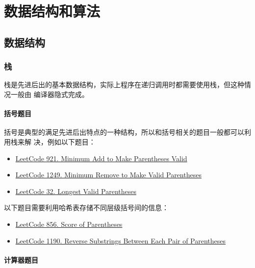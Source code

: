 \part{数据结构和算法}

\chapter{数据结构}

\section{栈}
栈是先进后出的基本数据结构，实际上程序在递归调用时都需要使用栈，但这种情况一般由
编译器隐式完成。

\subsection{括号题目}
括号是典型的满足先进后出特点的一种结构，所以和括号相关的题目一般都可以利用栈来解
决，例如以下题目：


\begin{itemize}
  \item
    \href{https://leetcode.com/problems/minimum-add-to-make-parentheses-valid/}{LeetCode
      921. Minimum Add to Make Parentheses Valid}
  \item
    \href{https://leetcode.com/problems/minimum-remove-to-make-valid-parentheses/}{LeetCode
      1249. Minimum Remove to Make Valid Parentheses}
  \item
    \href{https://leetcode.com/problems/longest-valid-parentheses/}{LeetCode 32. Longest Valid Parentheses}
\end{itemize}

以下题目需要利用哈希表存储不同层级括号间的信息：

\begin{itemize}
  \item
    \href{https://leetcode.com/problems/score-of-parentheses/}{LeetCode 856. Score of Parentheses}
  \item
    \href{https://leetcode.com/problems/reverse-substrings-between-each-pair-of-parentheses/}{LeetCode
    1190. Reverse Substrings Between Each Pair of Parentheses}
\end{itemize}

\subsection{计算器题目}


